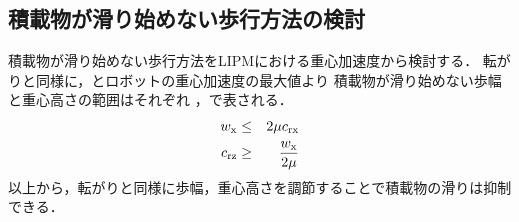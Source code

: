 \subsection{積載物が滑り始めない歩行方法の検討}
\label {3.2}
積載物が滑り始めない歩行方法をLIPMにおける重心加速度から検討する．
転がりと同様に，とロボットの重心加速度の最大値より
積載物が滑り始めない歩幅と重心高さの範囲はそれぞれ
，で表される．\\
\begin{eqnarray}
  \equlabel{2.0}
  {w}_{\mathrm{x}} &\leq& 2\mu{c}_{\mathrm{rx}}\\
  \equlabel{2.1}
  {c}_{\mathrm{rz}} &\geq& \frac{{w}_{\mathrm{x}}}{2\mu}
\end{eqnarray}
以上から，転がりと同様に歩幅，重心高さを調節することで積載物の滑りは抑制できる．
 